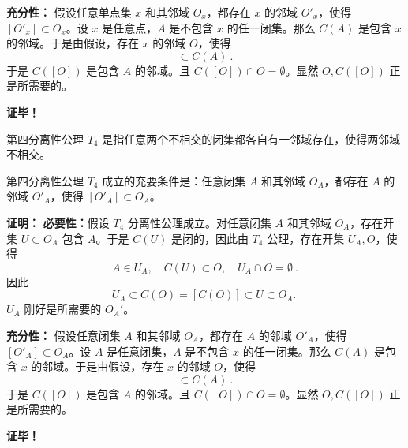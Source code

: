\textbf{充分性：} 假设任意单点集 $x$ 和其邻域 $O_x$，都存在 $x$ 的邻域 $ O'_x$，使得 $[O'_x]\subset O_x$。设 $x$ 是任意点，$A$ 是不包含 $x$ 的任一闭集。那么 $C(A)$ 是包含 $x$ 的邻域。于是由假设，存在 $x$ 的邻域 $O$，使得 
\begin{equation}
[O]\subset C(A)~.
\end{equation}
于是 $C([O])$ 是包含 $A$ 的邻域。且 $C([O])\cap O=\emptyset $。显然 $O,C([O])$ 正是所需要的。

\textbf{证毕！}


第四分离性公理 $T_4$ 是指任意两个不相交的闭集都各自有一邻域存在，使得两邻域不相交。

\begin{theorem}{}
第四分离性公理 $T_4$ 成立的充要条件是：任意闭集 $A$ 和其邻域 $O_A$，都存在 $A$ 的邻域 $ O'_A$，使得 $[O'_A]\subset O_A$。
\end{theorem}

\textbf{证明：}
\textbf{必要性：}假设 $T_4$ 分离性公理成立。对任意闭集 $A$ 和其邻域 $O_A$，存在开集 $U\subset O_A$ 包含 $A$。于是 $C(U)$ 是闭的，因此由 $T_4$ 公理，存在开集 $U_A, O$，使得
\begin{equation}
A\in U_A,\quad C(U)\subset O,\quad U_A\cap O=\emptyset~.
\end{equation}
因此
\begin{equation}
U_A\subset C(O)=[C(O)]\subset U\subset O_A.~
\end{equation}
$U_A$ 刚好是所需要的 $O_A'$。

\textbf{充分性：} 假设任意闭集 $A$ 和其邻域 $O_A$，都存在 $A$ 的邻域 $ O'_A$，使得 $[O'_A]\subset O_A$。设 $A$ 是任意闭集，$A$ 是不包含 $x$ 的任一闭集。那么 $C(A)$ 是包含 $x$ 的邻域。于是由假设，存在 $x$ 的邻域 $O$，使得 
\begin{equation}
[O]\subset C(A)~.
\end{equation}
于是 $C([O])$ 是包含 $A$ 的邻域。且 $C([O])\cap O=\emptyset $。显然 $O,C([O])$ 正是所需要的。

\textbf{证毕！}




